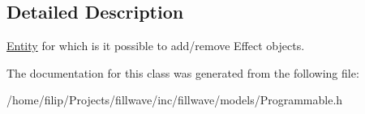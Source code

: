 \subsection{Detailed Description}
\hyperlink{classfillwave_1_1models_1_1Entity}{Entity} for which is it possible to add/remove Effect objects. 

The documentation for this class was generated from the following file\+:\begin{DoxyCompactItemize}
\item 
/home/filip/\+Projects/fillwave/inc/fillwave/models/Programmable.\+h\end{DoxyCompactItemize}
